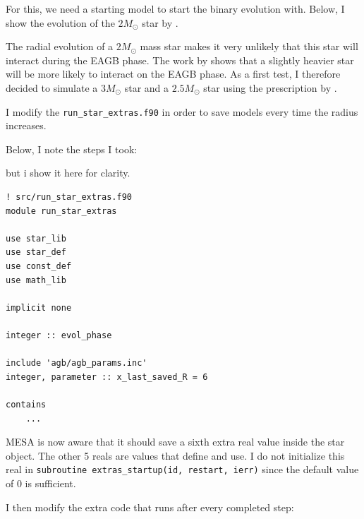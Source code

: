 \documentclass[a4paper,10pt]{article}
\begin{document}
    For this, we need a starting model to start the binary evolution with. 
    Below, I show the evolution of the \(2M_\odot \) star by \citet{rees2024b}.
    \begin{figure}[ht]
        \centering
    \end{figure}

    The radial evolution of a \(2M_\odot \) mass star makes it very unlikely that this star will interact during the EAGB phase. The work by \citet{temmink2022} shows that a slightly heavier star will be more likely to interact on the EAGB phase.
    As a first test, I therefore decided to simulate a \(3M_\odot \) star and a \(2.5M_\odot \) star using the prescription by \citet{rees2024b}.

    I modify the \lstinline[style=output, breaklines=true]|run_star_extras.f90| in order to save models every time the radius increases.

    Below, I note the steps I took:

 but i show it here for clarity.
    \begin{verbatim}
! src/run_star_extras.f90
module run_star_extras

use star_lib
use star_def
use const_def
use math_lib

implicit none

integer :: evol_phase

include 'agb/agb_params.inc' 
integer, parameter :: x_last_saved_R = 6 

contains
    ...
    \end{verbatim}
    MESA is now aware that it should save a sixth extra real value inside the star object. The other 5 reals are values that \citet{rees2024b} define and use. I do not initialize this real in \lstinline[style=output, breaklines=true]|subroutine extras_startup(id, restart, ierr)| since the default value of 0 is sufficient.

    I then modify the extra code that runs after every completed step:
\end{document}
